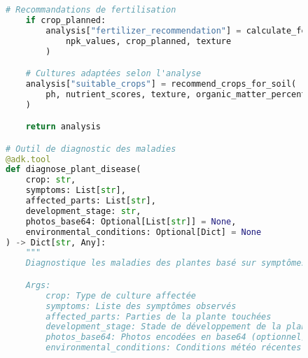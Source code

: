 \begin{figure}[h]
\begin{lstlisting}[language=Python, caption=Implémentation d'outils spécialisés pour l'agriculture]
    # Recommandations de fertilisation
    if crop_planned:
        analysis["fertilizer_recommendation"] = calculate_fertilizer_needs(
            npk_values, crop_planned, texture
        )

    # Cultures adaptées selon l'analyse
    analysis["suitable_crops"] = recommend_crops_for_soil(
        ph, nutrient_scores, texture, organic_matter_percent
    )

    return analysis

# Outil de diagnostic des maladies
@adk.tool
def diagnose_plant_disease(
    crop: str,
    symptoms: List[str],
    affected_parts: List[str],
    development_stage: str,
    photos_base64: Optional[List[str]] = None,
    environmental_conditions: Optional[Dict] = None
) -> Dict[str, Any]:
    """
    Diagnostique les maladies des plantes basé sur symptômes.

    Args:
        crop: Type de culture affectée
        symptoms: Liste des symptômes observés
        affected_parts: Parties de la plante touchées
        development_stage: Stade de développement de la plante
        photos_base64: Photos encodées en base64 (optionnel)
        environmental_conditions: Conditions météo récentes


\end{lstlisting}
\end{figure}
